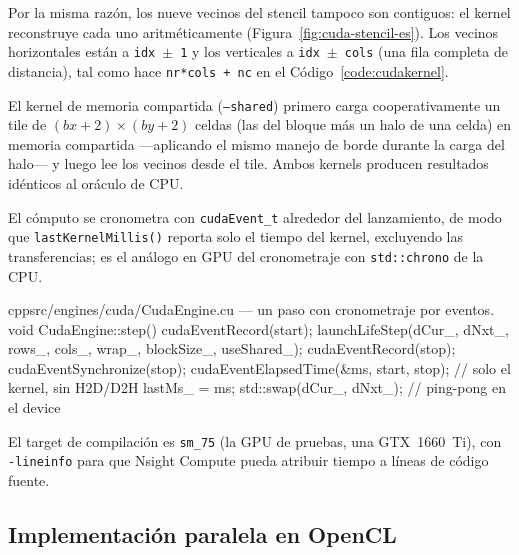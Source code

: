 \documentclass[
	spanish,
	letterpaper, oneside
]{article}
\begin{document}
Por la misma razón, los nueve vecinos del stencil tampoco son contiguos:
el kernel reconstruye cada uno aritméticamente
(Figura~\ref{fig:cuda-stencil-es}). Los vecinos horizontales están a
\texttt{idx}~$\pm$~\texttt{1} y los verticales a \texttt{idx}~$\pm$~\texttt{cols}
(una fila completa de distancia), tal como hace \texttt{nr*cols + nc} en el
Código~\ref{code:cudakernel}.


El kernel de memoria compartida (\texttt{--shared}) primero carga
cooperativamente un tile de $(bx{+}2)\times(by{+}2)$ celdas (las del bloque
más un halo de una celda) en memoria compartida ---aplicando el mismo manejo de
borde durante la carga del halo--- y luego lee los vecinos desde el tile.
Ambos kernels producen resultados idénticos al oráculo de CPU.

El cómputo se cronometra con \texttt{cudaEvent\_t} alrededor del lanzamiento, de
modo que \texttt{lastKernelMillis()} reporta solo el tiempo del kernel, excluyendo
las transferencias; es el análogo en GPU del cronometraje con \texttt{std::chrono}
de la CPU.

\begin{sourcecode}{cpp}{src/engines/cuda/CudaEngine.cu --- un paso con cronometraje por eventos.}
void CudaEngine::step() {
  cudaEventRecord(start);
  launchLifeStep(dCur_, dNxt_, rows_, cols_, wrap_, blockSize_, useShared_);
  cudaEventRecord(stop);
  cudaEventSynchronize(stop);
  cudaEventElapsedTime(&ms, start, stop);  // solo el kernel, sin H2D/D2H
  lastMs_ = ms;
  std::swap(dCur_, dNxt_);                  // ping-pong en el device
}
\end{sourcecode}

El target de compilación es \texttt{sm\_75} (la GPU de pruebas, una
GTX~1660~Ti), con \texttt{-lineinfo} para que Nsight Compute pueda atribuir tiempo
a líneas de código fuente.

\subsection{Implementación paralela en OpenCL}
\label{sec:impl-opencl}
\end{document}
